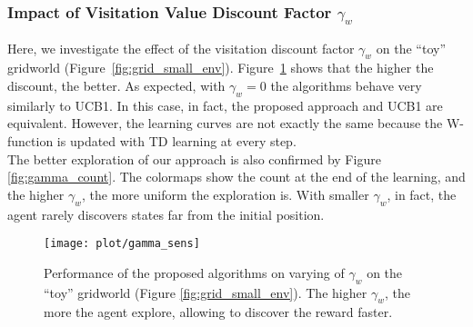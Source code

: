 \documentclass{article}
\begin{document}
\subsubsection{Impact of Visitation Value Discount Factor $\gamma_w$}
\label{sssec:gamma_sensitivity}
Here, we investigate the effect of the visitation discount factor $\gamma_w$ on the ``toy'' gridworld (Figure~\ref{fig:grid_small_env}). Figure~\ref{fig:gamma_plot} shows that the higher the discount, the better. As expected, with $\gamma_w = 0$ the algorithms behave very similarly to UCB1. In this case, in fact, the proposed approach and UCB1 are equivalent. However, the learning curves are not exactly the same because the W-function is updated with TD learning at every step. 
\\
The better exploration of our approach is also confirmed by Figure \ref{fig:gamma_count}. The colormaps show the count at the end of the learning, and the higher $\gamma_w$, the more uniform the exploration is. With smaller $\gamma_w$, in fact, the agent rarely discovers states far from the initial position.

\begin{figure}[t]
	\centering
	\texttt{[image: plot/gamma\_sens]}
	\caption{\label{fig:gamma_plot} Performance of the proposed algorithms on varying of $\gamma_w$ on the ``toy'' gridworld (Figure \ref{fig:grid_small_env}). The higher $\gamma_w$, the more the agent explore, allowing to discover the reward faster.}
\end{figure}
\end{document}
